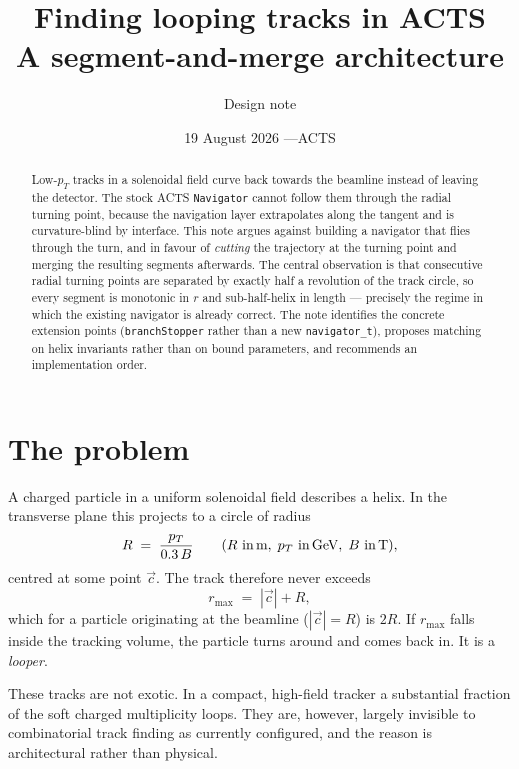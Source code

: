 \documentclass[11pt,a4paper]{article}
\title{\bfseries Finding looping tracks in ACTS\\
       \large A segment-and-merge architecture}
\author{Design note}
\date{19 August 2026 \quad---\quad ACTS \code{664c82a5}}
\newcommand{\code}[1]{\texttt{\small #1}}
\begin{document}
\maketitle

\begin{abstract}
\noindent
Low-$p_T$ tracks in a solenoidal field curve back towards the beamline instead
of leaving the detector. The stock ACTS \code{Navigator} cannot follow them
through the radial turning point, because the navigation layer extrapolates
along the tangent and is curvature-blind by interface. This note argues against
building a navigator that flies through the turn, and in favour of
\emph{cutting} the trajectory at the turning point and merging the resulting
segments afterwards. The central observation is that consecutive radial
turning points are separated by exactly half a revolution of the track circle,
so every segment is monotonic in $r$ and sub-half-helix in length --- precisely
the regime in which the existing navigator is already correct. The note
identifies the concrete extension points (\code{branchStopper} rather than a new
\code{navigator\_t}), proposes matching on helix invariants rather than on
bound parameters, and recommends an implementation order.
\end{abstract}

\tableofcontents

\section{The problem}

A charged particle in a uniform solenoidal field describes a helix. In the
transverse plane this projects to a circle of radius
\begin{equation}
  R \;=\; \frac{p_T}{0.3\,B}
  \qquad (\text{$R$ in\,m}, \; p_T \text{ in\,GeV}, \; B \text{ in\,T}),
\end{equation}
centred at some point $\vec{c}$. The track therefore never exceeds
\begin{equation}
  r_{\max} \;=\; |\vec{c}| + R ,
  \label{eq:rmax}
\end{equation}
which for a particle originating at the beamline ($|\vec{c}| = R$) is $2R$. If
$r_{\max}$ falls inside the tracking volume, the particle turns around and comes
back in. It is a \emph{looper}.

These tracks are not exotic. In a compact, high-field tracker a substantial
fraction of the soft charged multiplicity loops. They are, however, largely
invisible to combinatorial track finding as currently configured, and the reason
is architectural rather than physical.
\end{document}
